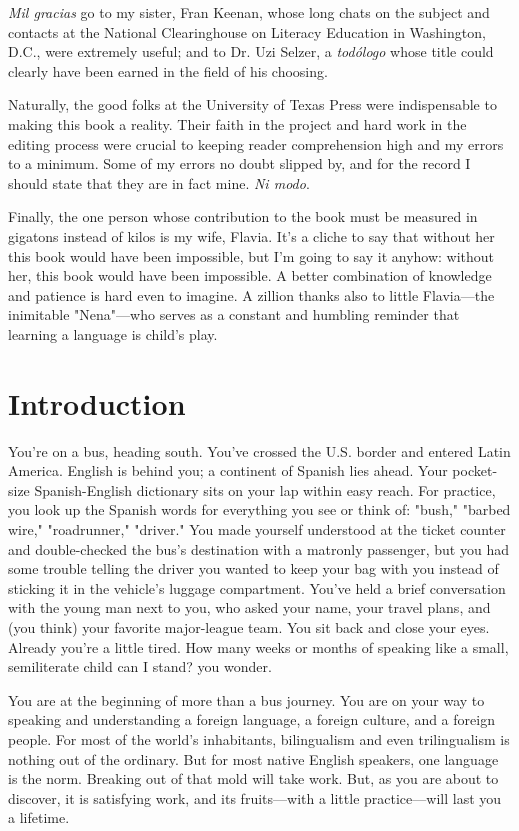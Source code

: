\emph{Mil gracias} go to my sister, Fran Keenan, whose long chats on
the subject and contacts at the National Clearinghouse on Literacy
Education in Washington, D.C., were extremely useful; and to Dr. Uzi
Selzer, a \emph{todólogo} whose title could clearly have been earned in the
field of his choosing.

Naturally, the good folks at the University of Texas Press were
indispensable to making this book a reality. Their faith in the project
and hard work in the editing process were crucial to keeping reader
comprehension high and my errors to a minimum. Some of my errors
no doubt slipped by, and for the record I should state that they are in
fact mine. \emph{Ni modo}.

Finally, the one person whose contribution to the book must
be measured in gigatons instead of kilos is my wife, Flavia. It's a cliche
to say that without her this book would have been impossible, but I'm
going to say it anyhow: without her, this book would have been impossible. A better combination of knowledge and patience is hard even to
imagine. A zillion thanks also to little Flavia---the inimitable "Nena"---who serves as a constant and humbling reminder that learning a language is child's play.

\chapter{Introduction}

You're on a bus, heading south. You've crossed the U.S. border
and entered Latin America. English is behind you; a continent of Spanish lies ahead. Your pocket-size Spanish-English dictionary sits on your
lap within easy reach. For practice, you look up the Spanish words for
everything you see or think of: "bush," "barbed wire," "roadrunner,"
"driver." You made yourself understood at the ticket counter and
double-checked the bus's destination with a matronly passenger, but
you had some trouble telling the driver you wanted to keep your bag
with you instead of sticking it in the vehicle's luggage compartment.
You've held a brief conversation with the young man next to you,
who asked your name, your travel plans, and (you think) your favorite
major-league team. You sit back and close your eyes. Already you're a
little tired. How many weeks or months of speaking like a small, semiliterate child can I stand? you wonder.

You are at the beginning of more than a bus journey. You are
on your way to speaking and understanding a foreign language, a foreign culture, and a foreign people. For most of the world's inhabitants,
bilingualism and even trilingualism is nothing out of the ordinary. But
for most native English speakers, one language is the norm. Breaking
out of that mold will take work. But, as you are about to discover, it is
satisfying work, and its fruits---with a little practice---will last you a
lifetime.

